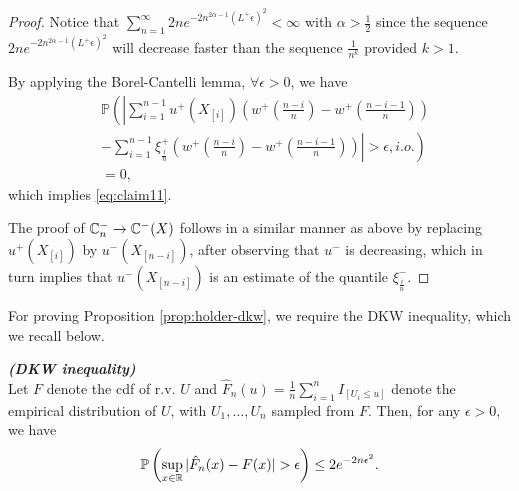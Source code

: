 \begin{proof}
Notice that $\sum_{n=1}^{\infty}  2n  e^{-2n^{2\alpha-1} (L^{+} \epsilon)^2}< \infty$ with $\alpha > \frac{1}{2}$ since the sequence 
$2n e^{-2n^{2\alpha-1} (L^{+}\epsilon)^2}$ will decrease faster than the sequence
$\frac{1}{n^k}$ provided $k>1$.

By applying the Borel-Cantelli lemma,  $\forall \epsilon >0$, we have 
\begin{align*}
&\mathbb{P} \left( \left| \sum_{i=1}^{n-1} u^+\left(X_{[i]}\right)  \left(w^+\left(\frac{n-i}{n} \right)  - w^+\left(\frac{n-i-1}{n} \right) \right)\right.\right. \\
&\left.\left.-
\sum_{i=1}^{n-1} \xi^+_{\frac{i}{n}}  \left(w^+\left(\frac{n-i}{n} \right)  - w^+\left(\frac{n-i-1}{n} \right) \right) \right| >
\epsilon , i.o.\right) \\
&=0, 
\end{align*}
which implies  \eqref{eq:claim11}. 

The proof of 
$\mathbb{C}_{n}^{-} \rightarrow \mathbb{C}^{-}(X)$ follows in a similar manner as above by replacing $u^+(X_{[i]})$ by $u^-(X_{[n-i]})$, after observing that $u^{-}$ is decreasing, which in turn implies that
$u^-(X_{[n-i]})$ is an estimate of the quantile $\xi^{-}_{\frac{i}{n}}$.
\end{proof}


For proving Proposition \ref{prop:holder-dkw}, we require the DKW inequality, which we recall below.
\begin{lemma}{\textbf{\textit{(DKW inequality)}}}\\
Let $F$ denote the cdf of r.v. $U$ and ${\hat F_n}(u)=\frac{1}{n} \sum_{i=1}^n I_{\left[U_i \leq u\right]}$ denote the empirical distribution of $U$, with $U_1,\ldots,U_n$ sampled from $F$.
Then, for any $\epsilon>0$, we have
$$
\Prob{\sup_{x\in \mathbb{R}}|\hat{F}_n(x)-F(x)|>\epsilon } \leq 2 e^{-2n\epsilon^2}.
$$
\end{lemma}

